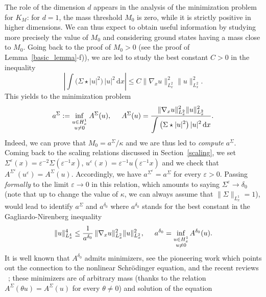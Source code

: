 \documentclass[10pt]{amsart}
\theoremstyle{definition}
\let\ds\displaystyle
\newcommand{\ud}{\, {\mathrm{d}}}
\begin{document}
The role of the dimension $d$ appears in the analysis of the minimization problem for $K_{M}$: for $d=1$, the mass threshold $M_0$ is zero, while it is strictly positive in higher dimensions.
We can thus expect to obtain useful information by
studying more precisely the value of $M_0$ and
considering
ground states having a mass close to $M_{0}$.
Going back to the proof of $M_{0}>0$ (see the proof of Lemma~\ref{basic_lemma}-f)), we are led to study
the best constant $C>0$ in the inequality
\[
\left|\int\big(\Sigma\star|u|^{2}\big)\,|u|^{2}\ud x\right|\leq C\|\nabla_{x}u\|_{L_{x}^{2}}^{2}\|u\|_{L_{x}^{2}}^{2}.
\]
This yields to the minimization problem\vspace*{-5pt}
\[
a^{\Sigma}:=\underset{\substack{u\in H_{x}^{1} \\ u\neq 0}}{\inf}\;A^{\Sigma}(u), \hspace{0.5cm} A^{\Sigma}(u)=\ds\frac{\ds\|\nabla_{x}u\|_{L_{x}^{2}}^{2}\|u\|_{L_{x}^{2}}^{2}}{\ds\int\big(\Sigma\star|u|^{2}\big)\,|u|^{2}\ud x}.
\]
Indeed, we can prove that $M_{0}=a^{\Sigma}/\kappa$ and we are thus led to \emph{compute} $a^{\Sigma}$.
Coming back to the scaling relations discussed in Section~\ref{scaling}, we set $\Sigma^{\varepsilon}(x)=\varepsilon^{-2}\Sigma(\varepsilon^{-1}x)$, $u^{\varepsilon}(x)=\varepsilon^{-1}u(\varepsilon^{-1}x)$ and we check that $A^{\Sigma^{\varepsilon}}(u^{\varepsilon})=A^{\Sigma}(u)$.
Accordingly, we have $a^{\Sigma^{\varepsilon}}=a^{\Sigma}$ for every $\varepsilon>0$. Passing \emph{formally} to the limit $\varepsilon\to 0$ in this relation, which amounts to saying $\Sigma^{\varepsilon}\to\delta_{0}$ (note that up to change the value of $\kappa$, we can always assume that $\|\Sigma\|_{L_{x}^{1}}=1$), would lead to identify $a^{\Sigma}$ and $a^{\delta_{0}}$ where $a^{\delta_{0}}$ stands for the best constant in the Gagliardo-Nirenberg inequality\vspace*{-3pt}
\[
\|u\|_{L_{x}^{4}}^{4}\leq \ds\frac{1}{a^{\delta_{0}}}\,\|\nabla_{x}u\|_{L_{x}^{2}}^{2}\|u\|_{L_{x}^{2}}^{2}, \hspace{0.5cm} a^{\delta_{0}}=\underset{\substack{u\in H_{x}^{1} \\ u\neq 0}}{\inf}\, A^{\delta_{0}}(u).
\]
It is well known that $A^{\delta_{0}}$ admits minimizers, see
the pioneering work \cite[Th.\,B]{weinstein1982} which points out the connection to the nonlinear Schrödinger equation,
and the recent reviews \cite{Bol, DPD}~; these minimizers are of arbitrary mass (thanks to the relation $A^{\Sigma}(\theta u)=A^{\Sigma}(u)$ for every $\theta\neq 0$) and solution of the equation\vspace*{-3pt}
\end{document}
